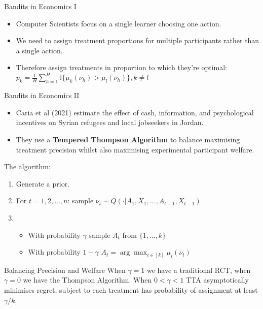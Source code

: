 \documentclass[aspectratio=169,xcolor=dvipsnames]{beamer}
\begin{document}
\begin{frame}{Bandits in Economics I}
    \begin{itemize}
        \item Computer Scientists focus on a single learner choosing one action.
        \item We need to assign treatment proportions for multiple participants rather 
        than a single action.
        \item Therefore assign treatments in proportion to which they're optimal:
        $p_k = \frac{1}{H} \sum^H_{h=1} \mathbb{I}\{\mu_k(\nu_{h})  > \mu_l(\nu_{h}) \}, k \neq l$
    \end{itemize}
\end{frame}


\begin{frame}{Bandits in Economics II}


    \begin{itemize}
        \item Caria et al (2021) estimate the effect of cash, information, and psychological 
    incentives on Syrian refugees and local jobseekers in Jordan. 
        \item They use a \textbf{Tempered Thompson Algorithm} to balance maximising treatment 
    precision whilst also maximising experimental participant welfare.
    \end{itemize}

    The algorithm:

    \begin{enumerate}
        \item Generate a prior.
        \item For $t = 1,2,...,n$: sample $\nu_t \sim Q(\cdot | A_1, X_1, ..., A_{t-1}, X_{t-1})$
        \item \begin{itemize}
            \item With probability $\gamma$  sample $A_t$ from $\{1, ..., k\}$
            \item With probability $1 - \gamma$ $A_t = \arg\max_{i \in [k]} \mu_i(\nu_t)$
        \end{itemize} 
    \end{enumerate}

    \begin{exampleblock}{Balancing Precision and Welfare}
        When $\gamma = 1$ we have a traditional RCT, when $\gamma = 0$ we have the 
        Thompson Algorithm. 
        When $0 < \gamma < 1$ TTA asymptotically minimises regret, subject to  
        each treatment has probability of assignment at least $\gamma/k$.
    \end{exampleblock}
\end{frame}
\end{document}
